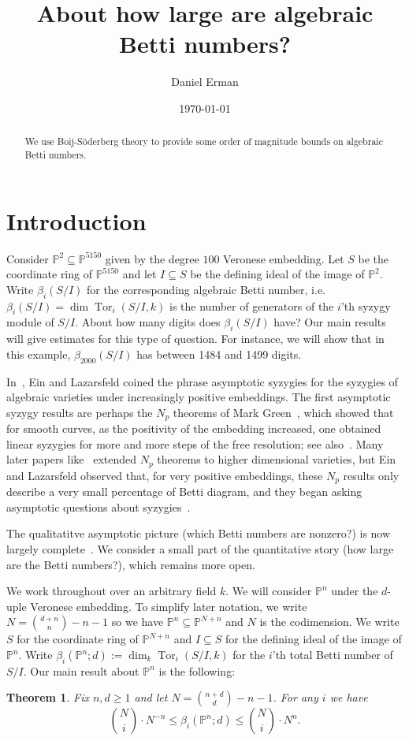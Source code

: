 \documentclass[12pt]{amsart}
\title{About how large are algebraic Betti numbers?}
\date{\today}
\author{Daniel Erman}
\newtheorem{thm}[lemma]{Theorem}
\theoremstyle{remark}
\newcommand{\Tor}{\operatorname{Tor}}
\newcommand{\defi}[1]{\textsf{#1}} %
\newcommand{\PP}{\mathbb P}
\begin{document}
\maketitle
\begin{abstract}
We use Boij-S\"oderberg theory to provide some order of magnitude bounds on algebraic Betti numbers.
\end{abstract}

\section{Introduction}\label{sec:intro}

Consider $\mathbb P^2\subseteq \PP^{5150}$ given by the degree $100$ Veronese embedding.  Let $S$ be the coordinate ring of $\PP^{5150}$ and let $I\subseteq S$ be the defining ideal of the image of $\PP^2$.  Write $\beta_{i}(S/I)$ for the corresponding algebraic Betti number, i.e. $\beta_{i}(S/I) = \dim \Tor_{i}(S/I,k)$ is the number of generators of the $i$'th syzygy module of $S/I$. About how many digits does $\beta_{i}(S/I)$ have? Our main results will give estimates for this type of question.  For instance, we will show that  in this example, $\beta_{2000}(S/I)$ has between 1484 and 1499 digits.


In~\cite{EL-asymptotic}, Ein and Lazarsfeld coined the phrase \defi{asymptotic syzygies} for the syzygies of algebraic varieties under increasingly positive embeddings.  The first asymptotic syzygy results are perhaps the $N_p$ theorems of Mark Green~\cite{green1}, which showed that for smooth curves, as the positivity of the embedding increased, one obtained linear syzygies for more and more steps of the free resolution; see also~\cite{green-laz2, green-laz1, lazarsfeld-sampling}.  Many later papers like~\cite{EL-higher} extended $N_p$ theorems to higher dimensional varieties, but Ein and Lazarsfeld observed that, for very positive embeddings, these $N_p$ results only describe a very small percentage of Betti diagram, and they began asking asymptotic questions about syzygies~\cite{EL-asymptotic, EL-progress-and-questions}.  

The qualitatitve asymptotic picture (which Betti numbers are nonzero?) is now largely complete~\cite{EL-asymptotic,park,raicu}.  We consider a small part of the quantitative story (how large are the Betti numbers?), which remains more open.

\medskip

We work throughout over an arbitrary field $k$.  We will consider $\PP^n$ under the $d$-uple Veronese embedding.  To simplify later notation, we write $N = \binom{d+n}{n}-n-1$ so we have $\PP^n \subseteq \PP^{N+n}$ and $N$ is the codimension.  We write $S$ for the coordinate ring of $\PP^{N+n}$ and $I\subseteq S$ for the defining ideal of the image of $\PP^n$.  Write $\beta_{i}(\PP^n;d):=\dim_k \Tor_{i}(S/I,k)$ for the $i$'th total Betti number of $S/I$.
Our main result about $\PP^n$ is the following:
\begin{thm}\label{thm:mainPn}
Fix $n,d\geq 1$ and let $N=\binom{n+d}{d} - n-1$.  For any $i$ we have
\[
 \binom{N}{i}\cdot N^{-n} \leq \beta_i(\PP^n; d)  \leq \binom{N}{i} \cdot N^n.
\]
\end{thm}
\end{document}
